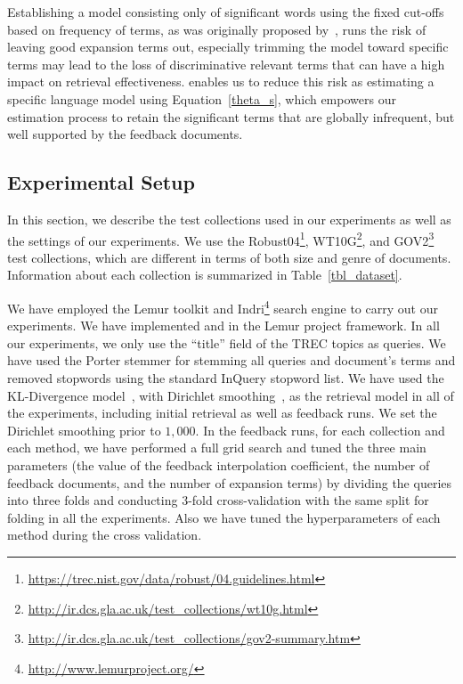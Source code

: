 Establishing a model consisting only of significant words using the fixed cut-offs based on frequency of terms, as was originally proposed by~\citet{Luhn:1958}, runs the risk of leaving good expansion terms out, especially trimming the model toward specific terms may lead to the loss of discriminative relevant terms that can have a high impact on retrieval effectiveness. \acswlm enables us to reduce this risk as estimating a specific language model using Equation~\ref{theta_s}, which empowers our estimation process to retain the significant terms that are globally infrequent, but well supported by the feedback documents.

\subsection{Experimental Setup}
\label{sec:dataset}

In this section, we describe the test collections used in our experiments as well as the settings of our experiments. 
We use the Robust04\footnote{\url{https://trec.nist.gov/data/robust/04.guidelines.html}}, WT10G\footnote{\url{http://ir.dcs.gla.ac.uk/test_collections/wt10g.html}}, and GOV2\footnote{\url{http://ir.dcs.gla.ac.uk/test_collections/gov2-summary.htm}} test collections, which are different in terms of both size and genre of documents. 
Information about each collection is summarized in Table~\ref{tbl_dataset}.

We have employed the Lemur toolkit and Indri\footnote{\url{http://www.lemurproject.org/}} search engine to carry out our experiments. We have implemented \acswlm and \acrswlm in the Lemur project framework. 
In all our experiments, we only use the ``title'' field of the TREC topics as queries. 
We have used the Porter stemmer for stemming all queries and document's terms and removed stopwords using the standard InQuery stopword list. 
We have used the KL-Divergence model~\citep{Lafferty:2001}, with Dirichlet smoothing~\citep{Zhai:2001}, as the retrieval model in all of the experiments, including initial retrieval as well as feedback runs.
We set the Dirichlet smoothing prior to $1,000$.  In the feedback runs, for each collection and each method, we have performed a full grid search and tuned  the three main parameters (the value of the feedback interpolation coefficient, the number of feedback documents, and the number of expansion terms) by dividing the queries into three folds and conducting 3-fold cross-validation with the same split for folding in all the experiments.  Also we have tuned the hyperparameters of each method during the cross validation.

